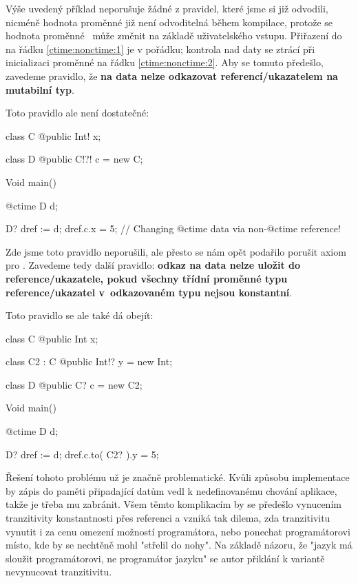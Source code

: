 Výše uvedený příklad neporušuje žádné z pravidel, které jsme si již odvodili, nicméně hodnota proměnné  již není odvoditelná během kompilace, protože se hodnota proměnné ~může změnit na základě uživatelského vstupu. Přiřazení do  na řádku \ref{ctime:nonctime:1} je v pořádku; kontrola nad daty se ztrácí při inicializaci proměnné  na řádku \ref{ctime:nonctime:2}. Aby se tomuto předešlo, zavedeme pravidlo, že \textbf{na \ctime data nelze odkazovat \nonctime referencí/ukazatelem na mutabilní typ}.

Toto pravidlo ale není dostatečné:

\begin{code}
class C {
	@public Int! x;
}

class D {
	@public C!?! c = new C;
}

Void main() {
	@ctime D d;
	
	D? dref := d;
	dref.c.x = 5; // Changing @ctime data via non-@ctime reference!
}
\end{code}

Zde jsme toto pravidlo neporušili, ale přesto se nám opět podařilo porušit axiom pro \ctime. Zavedeme tedy další pravidlo: \textbf{odkaz na \ctime data nelze uložit do \nonctime reference/ukazatele, pokud všechny třídní proměnné typu reference/ukazatel v~odkazovaném typu nejsou konstantní}.

Toto pravidlo se ale také dá obejít:

\begin{code}
class C {
	@public Int x;
}

class C2 : C {
	@public Int!? y = new Int;
}

class D {
	@public C? c = new C2;
}

Void main() {
	@ctime D d;
	
	D? dref := d;
	dref.c.to( C2? ).y = 5;
}
\end{code}

Řešení tohoto problému už je značně problematické. Kvůli způsobu implementace by zápis do paměti připadající \ctime datům vedl k nedefinovanému chování aplikace, takže je třeba mu zabránit. Všem těmto komplikacím by se předešlo vynucením tranzitivity konstantnosti přes referenci a vzniká tak dilema, zda tranzitivitu vynutit i za cenu omezení možností programátora, nebo ponechat programátorovi místo, kde by se nechtěně mohl "střelil do nohy". Na základě názoru, že "jazyk má sloužit programátorovi, ne programátor jazyku" se autor přiklání k variantě nevynucovat tranzitivitu.

